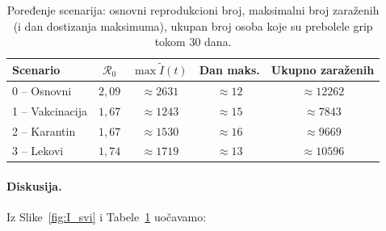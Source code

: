 \documentclass[12pt,a4paper]{article}
\begin{document}
	\begin{table}[H]
		\centering
		\caption{Poređenje scenarija: osnovni reprodukcioni broj, maksimalni broj zaraženih (i dan dostizanja maksimuma), ukupan broj osoba koje su prebolele grip tokom 30 dana.}
		\label{tab:poredjenje}
		\setlength{\tabcolsep}{9pt}
		\begin{tabular}{lcccc}
			\toprule
			Scenario & $\mathcal{R}_0$ & $\max \tilde{I}(t)$ & Dan maks. & Ukupno zaraženih \\
			\midrule
			0 -- Osnovni    & $2{,}09$ & $\approx 2631$ & $\approx 12$ & $\approx 12262$ \\
			1 -- Vakcinacija & $1{,}67$ & $\approx 1243$ & $\approx 15$ & $\approx 7843$ \\
			2 -- Karantin   & $1{,}67$ & $\approx 1530$ & $\approx 16$ & $\approx 9669$ \\
			3 -- Lekovi      & $1{,}74$ & $\approx 1719$ & $\approx 13$ & $\approx 10596$ \\
			\bottomrule
		\end{tabular}
	\end{table}
	
	\paragraph{Diskusija.} Iz Slike~\ref{fig:I_svi} i Tabele~\ref{tab:poredjenje} uočavamo:
	
\end{document}
